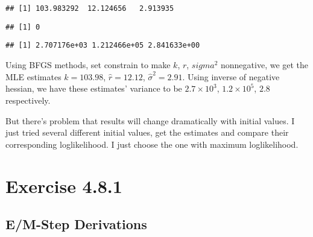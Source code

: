 \documentclass[]{book}
\newenvironment{Shaded}{\begin{snugshade}}{\end{snugshade}}
\newcommand{\KeywordTok}[1]{\textcolor[rgb]{0.13,0.29,0.53}{\textbf{#1}}}
\newcommand{\OperatorTok}[1]{\textcolor[rgb]{0.81,0.36,0.00}{\textbf{#1}}}
\newcommand{\NormalTok}[1]{#1}
\theoremstyle{definition}
\theoremstyle{definition}
\theoremstyle{definition}
\theoremstyle{remark}
\begin{document}
\begin{verbatim}
## [1] 103.983292  12.124656   2.913935
\end{verbatim}

\begin{Shaded}
\end{Shaded}

\begin{verbatim}
## [1] 0
\end{verbatim}

\begin{Shaded}
\end{Shaded}

\begin{verbatim}
## [1] 2.707176e+03 1.212466e+05 2.841633e+00
\end{verbatim}

Using BFGS methods, set constrain to make \(k\), \(r\), \(sigma^2\)
nonnegative, we get the MLE estimates \(\hat{k} = 103.98\),
\(\hat{r} = 12.12\), \(\hat{\sigma}^2 = 2.91\). Using inverse of
negative hessian, we have these estimates' variance to be
\(2.7\times 10^3\), \(1.2\times 10^5\), \(2.8\) respectively.

But there's problem that results will change dramatically with initial
values. I just tried several different initial values, get the estimates
and compare their corresponding loglikelihood. I just choose the one
with maximum loglikelihood.

\chapter{Exercise 4.8.1}\label{exercise-4.8.1}

\section{E/M-Step Derivations}\label{em-step-derivations}
\end{document}
